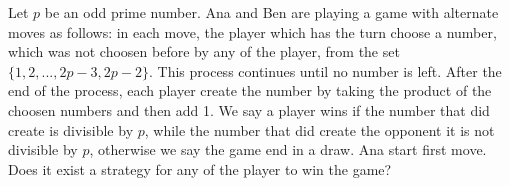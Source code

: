 Let $p$ be an odd prime number. Ana and Ben are playing a game with alternate moves as follows: in each move, the player which has the turn choose a number, which was not choosen before by any of the player, from the set $\{1,2,...,2p-3,2p-2\}$. This process continues until no number is left. After the end of the process, each player create the number by taking the product of the choosen numbers and then add 1. We say a player wins if the number that did create is divisible by $p$, while the number that did create the opponent it is not divisible by $p$, otherwise we say the game end in a draw. Ana start first move.
Does it exist a strategy for any of the player to win the game?

